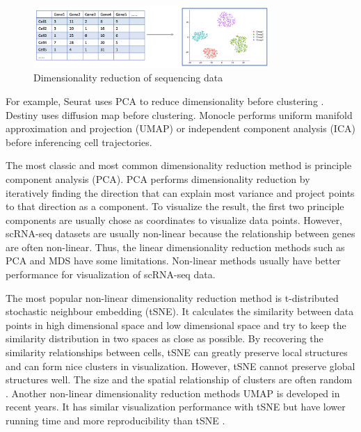 \begin{figure}[htb!]
    \centering
    \includegraphics[width=0.8\textwidth]{figures/myfigures/dr1.png}
    \caption{Dimensionality reduction of sequencing data}
    \label{dr1}
\end{figure}

For example, Seurat uses PCA \cite{Abdi2010} to reduce dimensionality before clustering \cite{Satija2015}. Destiny \cite{angerer2016destiny} uses diffusion map before clustering. Monocle \cite{Qiu2017} performs uniform manifold approximation and projection (UMAP) \cite{McInnes2018} or independent component analysis (ICA) \cite{hyvarinen2000independent} before inferencing cell trajectories. 

The most classic and most common dimensionality reduction method is principle component analysis (PCA). PCA performs dimensionality reduction by iteratively finding the direction that can explain most variance and project points to that direction as a component. To visualize the result, the first two principle components are usually chose as coordinates to visualize data points. However, scRNA-seq datasets are usually non-linear because the relationship between genes are often non-linear. Thus, the linear dimensionality reduction methods such as PCA and MDS \cite{Kruskal1964} have some limitations. Non-linear methods usually have better performance for visualization of scRNA-seq data.

The most popular non-linear dimensionality reduction method is t-distributed stochastic neighbour embedding (tSNE). It calculates the similarity between data points in high dimensional space and low dimensional space and try to keep the similarity distribution in two spaces as close as possible. By recovering the similarity relationships between cells, tSNE can greatly preserve local structures and can form nice clusters in visualization.  However, tSNE cannot preserve global structures well. The size and the spatial relationship of clusters are often random \cite{wattenberg2016how}. Another non-linear dimensionality reduction methods UMAP is developed in recent years. It has similar visualization performance with tSNE \cite{kobak2019umap} but have lower running time and more reproducibility than tSNE \cite{becht2019dimensionality}.

